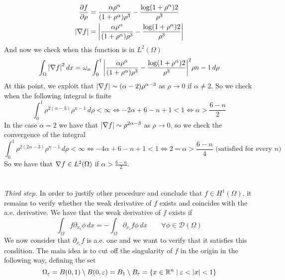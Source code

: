 \begin{align*}
\frac{\partial f}{\partial \rho} &= \frac{\alpha\rho^{\alpha}}{(1 + \rho^\alpha)\rho^3} - \frac{\log(1 + \rho^\alpha)2}{\rho^3}\\
\abs{\nabla f} &= \abs{\frac{\alpha\rho^{\alpha}}{(1 + \rho^\alpha)\rho^3} - \frac{\log(1 + \rho^\alpha)2}{\rho^3}}
\end{align*}
And now we check when this function is in \(L^2(\Omega)\)
\begin{align*}
\int_\Omega \abs{\nabla f}^2 \, dx = \omega_n \int_0^1 \abs{\frac{\alpha\rho^{\alpha}}{(1 + \rho^\alpha)\rho^3} - \frac{\log(1 + \rho^\alpha)2}{\rho^3}}^2 \rho{n-1}\, d\rho \\
\end{align*}
At this point, we exploit that $\abs{\nabla f} \sim (\alpha-2)\rho^{\alpha-3}$ as $\rho \to 0$ if $\alpha \neq 2$. 
So we check when the following integral is finite
\begin{equation*}
\int_0^1 \rho^{2(\alpha-3)}\rho^{n - 1} \, d\rho < \infty \iff -2\alpha + 6 - n + 1 < 1 \iff \alpha > \frac{6-n}{2}
\end{equation*}
In the case \(\alpha = 2\) we have that $\abs{\nabla f} \sim \rho^{2\alpha-3}$ as $\rho \to 0$, so we check the convergence of the integral
\begin{equation*}
\int_0^1 \rho^{2(2\alpha-3)} \rho^{n-1} \, d\rho < \infty \iff -4\alpha + 6 - n + 1 < 1 \iff 2 = \alpha > \frac{6-n}{4} \text{ (satisfied for every } n \text{)}
\end{equation*}
So we have that \(\nabla f \in L^2(\Omega)\) if \(\alpha > \frac{6-n}{2}\).\\
\\
\vspace{0.1cm}\\
\textit{Third step.} In order to justify other procedure and conclude that $f \in H^1(\Omega)$, 
it remains to verify whether the weak derivative of \(f\) exists and coincides with the a.e. derivative.
We have that the weak derivative of \(f\) exists if
\begin{equation}\label{eq:weak_derivative2}
\int_\Omega f \partial_{x_i} \phi \, dx = - \int_\Omega \partial_{x_i} f \phi \, dx \qquad \forall \phi \in \mathcal{D}(\Omega)
\end{equation}
We now consider that $\partial_{x_i} f$ is a.e. one and we want to verify that it satisfies this condition. 
The main idea is to cut off the singularity of \(f\) in the origin in the following way, defining the set
\[
    \Omega_\varepsilon = B(0, 1) \setminus B(0, \varepsilon) = B_1 \setminus B_\varepsilon = \left\{ x \in \mathbb{R}^n \mid \varepsilon < \abs{x} < 1 \right\}
\]
